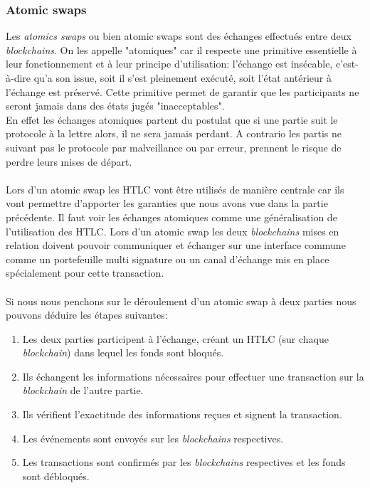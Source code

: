 \subsubsection{Atomic swaps}
Les \textit{atomics swaps} ou bien \glspl{atomic swap} sont des échanges effectués entre deux \textit{\gls{blockchain}s}\cite{herlihy2018atomic}. On les appelle "atomiques" car il respecte une primitive essentielle à leur fonctionnement et à leur principe d'utilisation: 
l'échange est insécable, c'est-à-dire qu'a son issue, soit il s'est pleinement exécuté, soit l'état antérieur à l'échange est préservé.
Cette primitive permet de garantir que les participants ne seront jamais dans des états jugés "inacceptables". \\
En effet les échanges atomiques partent du postulat que si une partie suit le protocole à la lettre alors, 
il ne sera jamais perdant. A contrario les partis ne suivant pas le protocole par malveillance ou par erreur, prennent le risque de perdre leurs mises de départ.\\ \\
Lors d'un \gls{atomic swap} les HTLC vont être utilisés de manière centrale car ils vont permettre d'apporter les garanties que nous avons vue dans la partie précédente. Il faut voir les échanges atomiques comme une généralisation de l'utilisation des HTLC. Lors d'un \gls{atomic swap} les deux \textit{\gls{blockchain}s} mises en relation doivent pouvoir communiquer et échanger sur une interface commune comme un portefeuille multi signature ou un canal d'échange mis en place spécialement pour cette transaction. \\ \\
Si nous nous penchons sur le déroulement d'un \gls{atomic swap} à deux parties nous pouvons déduire les étapes suivantes: 
\begin{enumerate}
    \item Les deux parties participent à l'échange, créant un HTLC (sur chaque \textit{\gls{blockchain}}) dans lequel les fonds sont bloqués. 
    \item Ils échangent les informations nécessaires pour effectuer une transaction sur la \textit{\gls{blockchain}} de l'autre partie. 
    \item Ils vérifient l'exactitude des informations reçues et signent la transaction. 
    \item Les événements sont envoyés sur les \textit{\gls{blockchain}s} respectives. 
    \item Les transactions sont confirmés par les \textit{\gls{blockchain}s} respectives et les fonds sont débloqués.
\end{enumerate}

